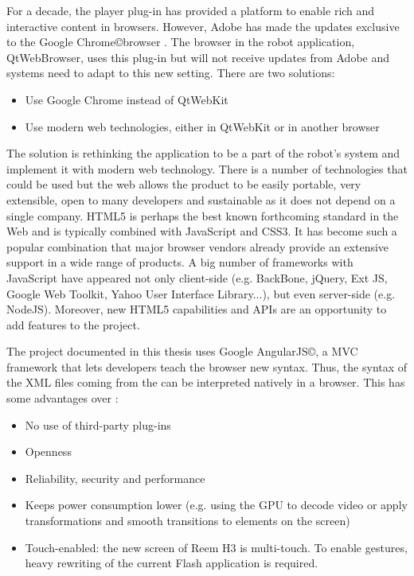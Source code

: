 For a decade, the \flash player plug-in has provided a platform to enable rich and interactive content in browsers.
However, Adobe has made the updates exclusive to the Google Chrome\copyright browser \cite{FlashRoadmap}. 
The browser in the robot application, QtWebBrowser, uses this plug-in but will not receive updates from Adobe and \company systems need to adapt to this new setting. 
There are two solutions:
\begin{itemize}
	\item Use Google Chrome instead of QtWebKit
	\item Use modern web technologies, either in QtWebKit or in another browser
\end{itemize}

The solution is rethinking the application to be a part of the robot's system and implement it with modern web technology.
There is a number of technologies that could be used but the web allows the product to be easily portable, very extensible, open to many developers and sustainable as it does not depend on a single company.
\ac{HTML5} is perhaps the best known forthcoming standard in the Web and is typically combined with JavaScript and \ac{CSS3}. 
It has become such a popular combination that major browser vendors already provide an extensive support in a wide range of products.
A big number of frameworks with JavaScript have appeared not only client-side (e.g. BackBone, jQuery, Ext JS, Google Web Toolkit, Yahoo User Interface Library...), but even server-side (e.g. NodeJS).
Moreover, new HTML5 capabilities and APIs are an opportunity to add features to the project.

The project documented in this thesis uses Google AngularJS\copyright, a \ac{MVC} framework that lets developers teach the browser new syntax. 
Thus, the syntax of the \ac{XML} files coming from the \se can be interpreted natively in a browser. 
This has some advantages over \flash \cite{Jobs:ThoughtsOnFlash}:
\begin{itemize}
    \item No use of third-party plug-ins
    \item Openness
    \item Reliability, security and performance
    \item Keeps power consumption lower (e.g. using the GPU to decode video or apply transformations and smooth transitions to elements on the screen)
    \item Touch-enabled: the new screen of Reem H3 is multi-touch. To enable gestures, heavy rewriting of the current Flash application is required.
\end{itemize}


